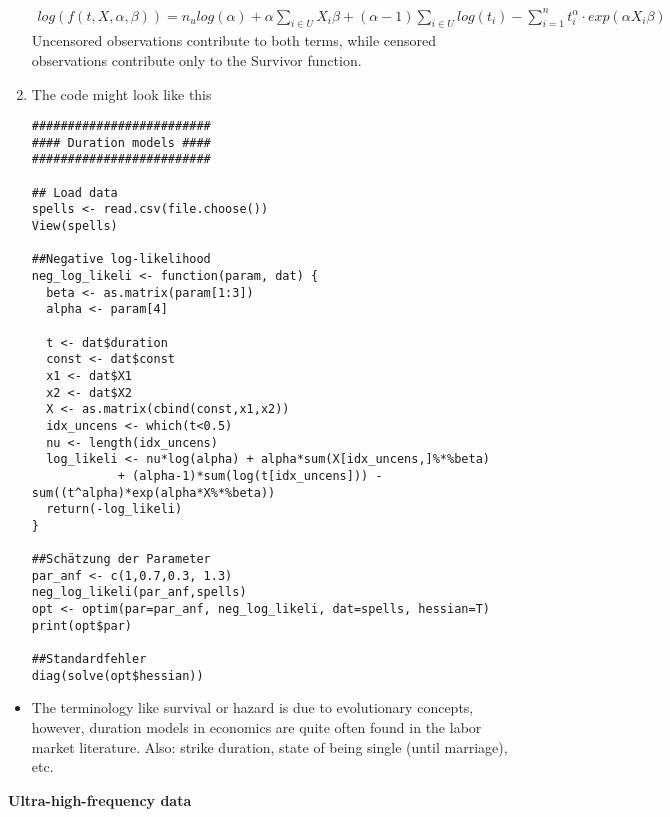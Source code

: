 \begin{Solution}{12.12}
\begin{enumerate}
\begin{align*}
log(f(t,X,\alpha,\beta)) = n_u log(\alpha) + \alpha \sum_{i\in U} X_i\beta + (\alpha-1) \sum_{i\in U}log(t_i)  - \sum_{i=1}^{n} t_i^\alpha \cdot exp(\alpha X_i \beta)
\end{align*}
Uncensored observations contribute to both terms, while censored observations contribute only to the Survivor function.
\item The code might look like this
\begin{verbatim}
#########################
#### Duration models ####
#########################

## Load data
spells <- read.csv(file.choose())
View(spells)

##Negative log-likelihood
neg_log_likeli <- function(param, dat) {
  beta <- as.matrix(param[1:3])
  alpha <- param[4]

  t <- dat$duration
  const <- dat$const
  x1 <- dat$X1
  x2 <- dat$X2
  X <- as.matrix(cbind(const,x1,x2))
  idx_uncens <- which(t<0.5)
  nu <- length(idx_uncens)
  log_likeli <- nu*log(alpha) + alpha*sum(X[idx_uncens,]%*%beta)
            + (alpha-1)*sum(log(t[idx_uncens])) - sum((t^alpha)*exp(alpha*X%*%beta))
  return(-log_likeli)
}

##Schätzung der Parameter
par_anf <- c(1,0.7,0.3, 1.3)
neg_log_likeli(par_anf,spells)
opt <- optim(par=par_anf, neg_log_likeli, dat=spells, hessian=T)
print(opt$par)

##Standardfehler
diag(solve(opt$hessian))
\end{verbatim}
\end{enumerate}
\begin{itemize}
\item The terminology like survival or hazard is due to evolutionary concepts, however, duration models in economics are quite often found in the labor market literature. Also: strike duration, state of being single (until marriage), etc.
\end{itemize}
\end{Solution}
\begin{Solution}{12.13}
\textbf{Ultra-high-frequency data}
\end{Solution}

